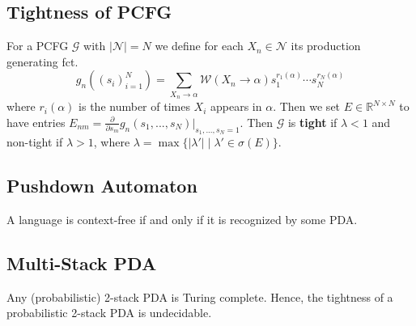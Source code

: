 \subsection*{Tightness of PCFG}
For a PCFG $\mathcal{G}$ with $|\mathcal{N}|=N$ we define for each $X_n\in\mathcal{N}$ its production generating fct.\\
$$\displaystyle g_n\left((s_i)_{i=1}^N\right)=\sum_{X_n\rightarrow \alpha}\mathcal{W}(X_n\rightarrow\alpha)s_1^{r_1(\alpha)}\cdots s_N^{r_N(\alpha)}$$ where $r_i(\alpha)$ is the number of times $X_i$ appears in $\alpha$. Then we set $E\in\mathbb{R}^{N\times N}$ to have entries $E_{nm}=\frac{\partial}{\partial s_m}g_n(s_1,...,s_N)\big|_{s_1,...,s_N=1}$. Then $\mathcal{G}$ is \textbf{tight} if $\lambda<1$ and non-tight if $\lambda>1$, where $\lambda=\max\big\{|\lambda'|\mid \lambda'\in\sigma(E)\big\}$.

\subsection*{Pushdown Automaton}
A language is context-free if and only if it is recognized by some PDA.

\subsection*{Multi-Stack PDA}
Any (probabilistic) 2-stack PDA is Turing complete. Hence, the tightness of a probabilistic 2-stack PDA is undecidable.
